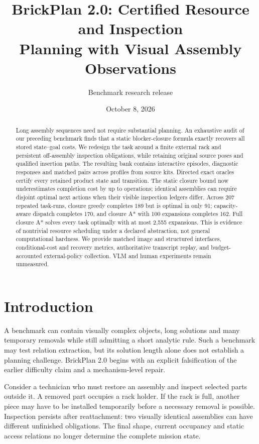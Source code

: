 \documentclass[10pt,twocolumn]{article}
\title{BrickPlan 2.0: Certified Resource and Inspection\\Planning with Visual Assembly Observations}
\author{Benchmark research release}
\date{October 8, 2026}
\begin{document}
\raggedbottom
\maketitle

\begin{abstract}
Long assembly sequences need not require substantial planning. An exhaustive
audit of our preceding benchmark finds that a static blocker-closure formula
exactly recovers all \OldLabels{} stored state--goal costs. We redesign the
task around a finite external rack and persistent off-assembly inspection
obligations, while retaining original source poses and qualified insertion
paths. The resulting bank contains \EpisodeCount{} interactive episodes,
\ProbeCount{} diagnostic responses and \PairCount{} matched pairs across
\ProfileCount{} profiles from \SourceCount{} source kits.
Directed exact oracles certify every retained product state and transition.
The static closure bound now underestimates completion cost by up to
\MaxGap{} operations; identical assemblies can require disjoint optimal
next actions when their visible inspection ledgers differ.
Across 207 repeated task-runs, closure greedy completes 189 but is optimal
in only 91; capacity-aware dispatch completes 170, and closure A* with
100 expansions completes 162. Full closure A* solves every task optimally
with at most 2,555 expansions. This is evidence of nontrivial resource
scheduling under a declared abstraction, not general computational hardness.
We provide matched image and structured interfaces, conditional-cost and
recovery metrics, authoritative transcript replay, and budget-accounted
external-policy collection. VLM and human experiments remain unmeasured.
\end{abstract}

\section{Introduction}
A benchmark can contain visually complex objects, long solutions and many
temporary removals while still admitting a short analytic rule. Such a
benchmark may test relation extraction, but its solution length alone does
not establish a planning challenge. BrickPlan 2.0 begins with an explicit
falsification of the earlier difficulty claim and a mechanism-level repair.

Consider a technician who must restore an assembly and inspect selected
parts outside it. A removed part occupies a rack holder. If the rack is
full, another piece may have to be installed temporarily before a necessary
removal is possible. Inspection persists after reattachment: two visually
identical assemblies can have different unfinished obligations. The final
shape, current occupancy and static access relations no longer determine
the complete mission state.
\end{document}
